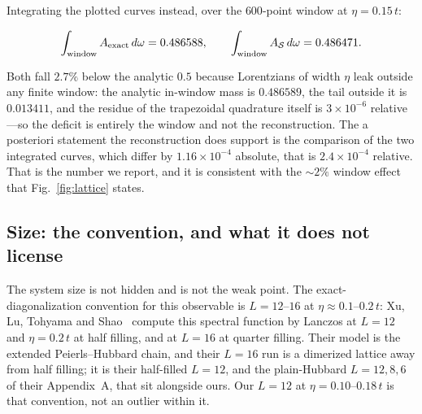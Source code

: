 Integrating the plotted curves instead, over the $600$-point window at $\eta=0.15\,t$:
\begin{widetext}
\begin{equation}
\int_{\rm window} A_{\rm exact}\,d\omega = 0.486588,
\qquad
\int_{\rm window} A_{\mathcal S}\,d\omega = 0.486471 .
\end{equation}
\end{widetext}
Both fall $2.7\%$ below the analytic $0.5$ because Lorentzians of width $\eta$ leak outside any finite
window: the analytic in-window mass is $0.486589$, the tail outside it is $0.013411$, and the residue
of the trapezoidal quadrature itself is $3\times10^{-6}$ relative---so the deficit is entirely the
window and not the reconstruction. The a posteriori statement the reconstruction does support is the
comparison of the two integrated curves, which differ by $1.16\times10^{-4}$ absolute, that is
$2.4\times10^{-4}$ relative. That is the number we report, and it is consistent with the ${\sim}2\%$ window effect that Fig.~\ref{fig:lattice} states.

\subsection{Size: the convention, and what it does not license}

The system size is not hidden and is not the weak point. The exact-diagonalization convention for this
observable is $L=12$--$16$ at $\eta\approx0.1$--$0.2\,t$: Xu, Lu, Tohyama and Shao~\cite{xu2024}
compute this spectral function by Lanczos at $L=12$ and $\eta=0.2\,t$ at half filling, and at
$L=16$ at quarter filling. Their model is the extended Peierls--Hubbard chain, and their $L=16$ run is
a dimerized lattice away from half filling; it is their half-filled $L=12$, and the plain-Hubbard
$L=12,8,6$ of their Appendix~A, that sit alongside ours. Our $L=12$ at $\eta=0.10$--$0.18\,t$ is that convention, not an outlier
within it.

